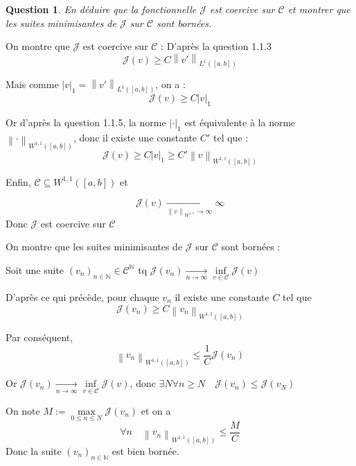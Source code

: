 \documentclass{article}
\newcommand{\Integer}{ \mathbb{N} }
\newcommand{\Abs}[1]{ \left| #1 \right| }
\newcommand{\Sobolev}[1]{ W^{1,1}\left( #1 \right) }
\newcommand{\Lebesgue}[1]{ L^{1}\left( #1 \right) }
\newcommand{\Norm}[2]{ \left\| #1 \right\|_{#2} }
\newcommand{\TendsTo}[4]{#1 \xrightarrow[#2  \rightarrow #3]{} #4}
\newtheorem{question}{Question}[subsection]
\newenvironment{answer}
  {\color{blue}}
  {}
\newcommand{\QuestionAnswer}[2]{
    \begin{question}
        #1
    \end{question}
    \begin{answer}
        #2
    \end{answer}
}
\newcommand{\SobolevSpace}{W^{1,1}}
\newcommand{\SetC}{\mathcal{C}}
\newcommand{\FunctionJ}{\mathcal{J}}
\begin{document}
\QuestionAnswer{
    En déduire que la fonctionnelle $\FunctionJ$ est coercive sur $\SetC$ et montrer que les suites minimisantes de $\FunctionJ$ sur $\SetC$ sont bornées.
}{
    On montre que $\FunctionJ$ est coercive sur $\SetC$ :\newline
    D'après la question 1.1.3 
    $$\FunctionJ(v) \geq C \Norm{v'}{\Lebesgue{[a,b]}}$$

    Mais comme $\Abs{v}_1 = \Norm{v'}{\Lebesgue{[a,b]}}$, on a :
    $$\FunctionJ(v) \geq C \Abs{v}_1$$

    Or d'après la question 1.1.5, la norme $\Abs{\cdot}_1$ est équivalente à la norme $\Norm{\cdot}{\Sobolev{[a,b]}}$, donc il existe une constante $C'$ tel que :
    $$\FunctionJ(v) \geq C \Abs{v}_1 \geq C' \Norm{v}{\Sobolev{[a,b]}}$$

    Enfin, $\SetC \subseteq \Sobolev{[a,b]}$ et

    $$\TendsTo{\FunctionJ(v)}{\Norm{v}{\SobolevSpace}}{\infty}{\infty}$$
    Donc $\FunctionJ$ est coercive sur $\SetC$\newline

    On montre que les suites minimisantes de $\FunctionJ$ sur $\SetC$ sont bornées :\newline

    Soit une suite $(v_n)_{n\in\Integer} \in \SetC^\Integer$ tq $\TendsTo{\FunctionJ(v_n)}{n}{\infty}{ \underset{v \in \SetC}{\inf} \FunctionJ(v)}$

    D'après ce qui précède, pour chaque $v_n$ il existe une constante $C$ tel que 
    $$\FunctionJ(v_n) \geq C \Norm{v_n}{\Sobolev{[a,b]}}$$


    Par conséquent,
    $$ \Norm{v_n}{\Sobolev{[a,b]}} \leq \frac{1}{C} \FunctionJ(v_n)$$

    Or $\TendsTo{\FunctionJ(v_n)}{n}{\infty}{ \underset{v \in \SetC}{\inf} \FunctionJ(v)}$, donc $\exists N \forall n \geq N \quad \FunctionJ(v_n) \leq \FunctionJ(v_N)$

    On note $M := \underset{0 \leq n \leq N}{\max}\FunctionJ(v_n)$ et on a 
    $$\forall n \quad \Norm{v_n}{\Sobolev{[a,b]}} \leq \frac{M}{C}$$
    Donc la suite $(v_n)_{n\in\Integer}$ est bien bornée.
}
\end{document}
